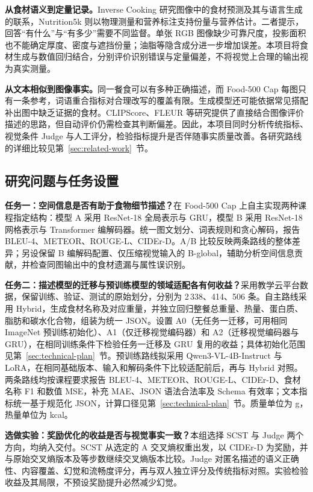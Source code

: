 \textbf{从食材语义到定量记录。}Inverse Cooking 研究图像中的食材预测及其与语言生成的联系，Nutrition5k 则以物理测量和营养标注支持份量与营养估计\cite{salvador2019inverse,thames2021nutrition}。二者提示，回答“有什么”与“有多少”需要不同监督。单张 RGB 图像缺少可靠尺度，投影面积也不能确定厚度、密度与遮挡份量；油脂等隐含成分进一步增加误差。本项目将食材生成与数值回归结合，分别评价识别错误与定量偏差，不将视觉上合理的输出视为真实测量。

\textbf{从文本相似到图像事实。}同一餐食可以有多种正确描述，而 Food-500 Cap 每图只有一条参考，词语重合指标对合理改写的覆盖有限。生成模型还可能依据常见搭配补出图中缺乏证据的食材。CLIPScore、FLEUR 等研究提供了直接结合图像评价描述的思路\cite{hessel2021clipscore,lee2024fleur}，但自动评价仍需检查其判断偏差。因此，本项目同时分析传统指标、视觉条件 Judge 与人工评分，检验指标提升是否伴随事实质量改善。各研究路线的详细比较见第~\ref{sec:related-work}~节。

\subsection{研究问题与任务设置}
\textbf{任务一：空间信息是否有助于食物细节描述？}在 Food-500 Cap 上自主实现两种课程指定结构：模型 A 采用 ResNet-18 全局表示与 GRU，模型 B 采用 ResNet-18 网格表示与 Transformer 编解码器。统一图文划分、词表规则和贪心解码，报告 BLEU-4、METEOR、ROUGE-L、CIDEr-D。A/B 比较反映两条路线的整体差异；另设保留 B 编解码配置、仅压缩视觉输入的 B-global，辅助分析空间信息贡献，并检查同图输出中的食材遗漏与属性误识别。

\textbf{任务二：描述模型的迁移与预训练模型的领域适配各有何收益？}采用教学云平台数据，保留训练、验证、测试的原始划分，分别为 2\,338、414、506 条。自主路线采用 Hybrid，生成食材名称及对应重量，并独立回归整餐总重量、热量、蛋白质、脂肪和碳水化合物，组装为统一 JSON。设置 A0（无任务一迁移，可用相同 ImageNet 预训练初始化）、A1（仅迁移视觉编码器）和 A2（迁移视觉编码器与 GRU），在相同训练条件下检验任务一迁移及 GRU 复用的收益；具体初始化范围见第~\ref{sec:technical-plan}~节。预训练路线拟采用 Qwen3-VL-4B-Instruct 与 LoRA，在相同基础版本、输入和解码条件下比较适配前后，再与 Hybrid 对照\cite{hu2022lora}。两条路线均按课程要求报告 BLEU-4、METEOR、ROUGE-L、CIDEr-D、食材名称 F1 和数值 MSE，补充 MAE、JSON 语法合法率及 Schema 有效率；文本指标统一基于规范化 JSON，计算口径见第~\ref{sec:technical-plan}~节。质量单位为 g，热量单位为 kcal。

\textbf{选做实验：奖励优化的收益是否与视觉事实一致？}本组选择 SCST 与 Judge 两个方向，均纳入交付。SCST 从选定的 A 交叉熵权重出发，以 CIDEr-D 为奖励，并与原始交叉熵版本及等步数继续交叉熵版本比较\cite{rennie2017scst}。Judge 对匿名描述的语义正确性、内容覆盖、幻觉和流畅度评分，再与双人独立评分及传统指标对照。实验检验收益及其局限，不预设奖励提升必然减少幻觉。

